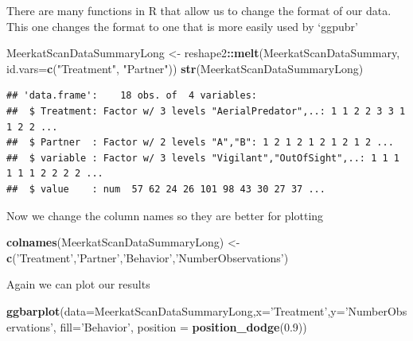 \documentclass[]{book}
\newenvironment{Shaded}{\begin{snugshade}}{\end{snugshade}}
\newcommand{\DataTypeTok}[1]{\textcolor[rgb]{0.13,0.29,0.53}{#1}}
\newcommand{\FloatTok}[1]{\textcolor[rgb]{0.00,0.00,0.81}{#1}}
\newcommand{\KeywordTok}[1]{\textcolor[rgb]{0.13,0.29,0.53}{\textbf{#1}}}
\newcommand{\NormalTok}[1]{#1}
\newcommand{\OperatorTok}[1]{\textcolor[rgb]{0.81,0.36,0.00}{\textbf{#1}}}
\newcommand{\StringTok}[1]{\textcolor[rgb]{0.31,0.60,0.02}{#1}}
\begin{document}
There are many functions in R that allow us to change the format of our data. This one changes the format to one that is more easily used by `ggpubr'

\begin{Shaded}
\begin{Highlighting}[]
\NormalTok{MeerkatScanDataSummaryLong <-}\StringTok{ }\NormalTok{reshape2}\OperatorTok{::}\KeywordTok{melt}\NormalTok{(MeerkatScanDataSummary, }\DataTypeTok{id.vars=}\KeywordTok{c}\NormalTok{(}\StringTok{"Treatment"}\NormalTok{, }\StringTok{"Partner"}\NormalTok{))}
\KeywordTok{str}\NormalTok{(MeerkatScanDataSummaryLong)}
\end{Highlighting}
\end{Shaded}

\begin{verbatim}
## 'data.frame':    18 obs. of  4 variables:
##  $ Treatment: Factor w/ 3 levels "AerialPredator",..: 1 1 2 2 3 3 1 1 2 2 ...
##  $ Partner  : Factor w/ 2 levels "A","B": 1 2 1 2 1 2 1 2 1 2 ...
##  $ variable : Factor w/ 3 levels "Vigilant","OutOfSight",..: 1 1 1 1 1 1 2 2 2 2 ...
##  $ value    : num  57 62 24 26 101 98 43 30 27 37 ...
\end{verbatim}

Now we change the column names so they are better for plotting

\begin{Shaded}
\begin{Highlighting}[]
\KeywordTok{colnames}\NormalTok{(MeerkatScanDataSummaryLong) <-}\StringTok{ }\KeywordTok{c}\NormalTok{(}\StringTok{'Treatment'}\NormalTok{,}\StringTok{'Partner'}\NormalTok{,}\StringTok{'Behavior'}\NormalTok{,}\StringTok{'NumberObservations'}\NormalTok{)}
\end{Highlighting}
\end{Shaded}

Again we can plot our results

\begin{Shaded}
\begin{Highlighting}[]
\KeywordTok{ggbarplot}\NormalTok{(}\DataTypeTok{data=}\NormalTok{MeerkatScanDataSummaryLong,}\DataTypeTok{x=}\StringTok{'Treatment'}\NormalTok{,}\DataTypeTok{y=}\StringTok{'NumberObservations'}\NormalTok{, }\DataTypeTok{fill=}\StringTok{'Behavior'}\NormalTok{,}
          \DataTypeTok{position =} \KeywordTok{position_dodge}\NormalTok{(}\FloatTok{0.9}\NormalTok{))}
\end{Highlighting}
\end{Shaded}
\end{document}
